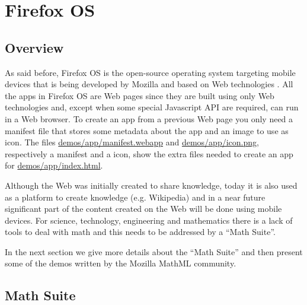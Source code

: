 \section{Firefox OS}
\label{sec:firefoxOS}

\subsection{Overview}

As said before,
Firefox OS is the open-source operating system targeting mobile devices that
is being
developed by Mozilla and based on Web technologies \cite{MozillaFirefoxOS}.
All the apps in Firefox OS
are Web pages since they are built using only Web technologies and, except when
some special Javascript API are required, can run in a Web browser.
To create an app from a previous Web page you only need a manifest
file that stores some metadata about the app and an image to use as icon. The
files
\href{http://fred-wang.github.io/MathUI2014/demos/app/manifest.webapp}{demos/app/manifest.webapp}
and
\href{http://fred-wang.github.io/MathUI2014/demos/app/icon.png}{demos/app/icon.png},
respectively a manifest and a icon,
show the extra files needed to create an app for
\href{http://fred-wang.github.io/MathUI2014/demos/app/index.html}{demos/app/index.html}.

Although the Web was initially created to share knowledge, today it is also used
as a platform to create knowledge (e.g. Wikipedia) and in a near future
significant part of the content created on the Web will be done using mobile
devices. For science, technology, engineering and mathematics there is a lack of
tools to deal with math and this needs to be addressed by a ``Math Suite''.

In the next section we give more details about the ``Math Suite'' and
then present some of the demos written by the Mozilla MathML community.

\subsection{Math Suite}

